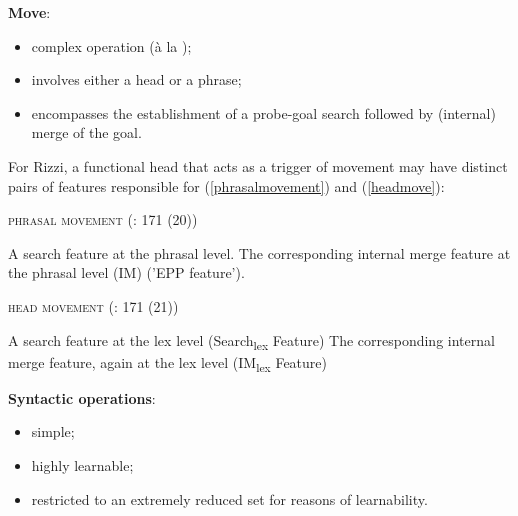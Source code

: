 \documentclass[fleqn,10pt]{wlscirep}
\begin{document}
\noindent\textbf{Move}: 
\begin{itemize}
    \item[\ding{227}] \vspace*{-2mm} complex operation (à la \citealt{chomsky2001});
    \item[\ding{227}] \vspace*{-2mm} involves either a head or a phrase;
    \item[\ding{227}] \vspace*{-2mm} encompasses the establishment of a probe-goal search followed by (internal) merge of the goal. 
\end{itemize}

For Rizzi, a functional head that acts as a trigger of movement may have distinct pairs of features responsible for (\ref{phrasalmovement}) and (\ref{headmove}):

\begin{exe}
    \ex \textsc{phrasal movement} (\citealt{rizzi2017}: 171 (20))
        \begin{xlist}
            \ex A search feature at the phrasal level.
            \ex The corresponding internal merge feature at the phrasal level (IM) ('EPP feature').
        \end{xlist}
        \label{phrasalmovement}
\end{exe}

\begin{exe}
    \ex \textsc{head movement} (\citealt{rizzi2017}: 171 (21)) 
        \begin{xlist}
            \ex A search feature at the lex level (Search\textsubscript{lex} Feature)
            \ex The corresponding internal merge feature, again at the lex level (IM\textsubscript{lex} Feature)
        \end{xlist}
        \label{headmove}
\end{exe}

\noindent\textbf{Syntactic operations}: 
\begin{itemize}
    \item[\ding{227}] \vspace*{-2mm} simple;
    \item[\ding{227}] \vspace*{-2mm} highly learnable;
    \item[\ding{227}] \vspace*{-2mm} restricted to an extremely reduced set for reasons of learnability.
\end{itemize}	
\end{document}
